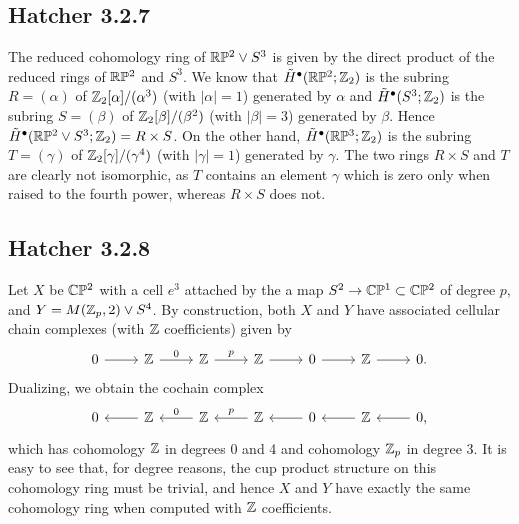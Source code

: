 \documentclass{../mathnotes}
\begin{document}
\subsection*{Hatcher 3.2.7}

The reduced cohomology ring of $\mathbb{R}\mathbb{P}^2\vee S^3$ is given by the direct product of the
reduced rings of $\mathbb{R}\mathbb{P}^2$ and $S^3$. We know that $\tilde H^\bullet(\mathbb{R}\mathbb{P}^2;\mathbb{Z}_2)$ is 
the subring $R=(\alpha)$ of $\mathbb{Z}_2[\alpha]/(\alpha^3)$ (with $|\alpha|=1$) generated by $\alpha$
and $\tilde H^\bullet(S^3;\mathbb{Z}_2)$ is the subring $S=(\beta)$ of $\mathbb{Z}_2[\beta]/(\beta^2)$ (with
$|\beta|=3$) generated by $\beta$. Hence $\tilde H^\bullet(\mathbb{R}\mathbb{P}^2\vee S^3;\mathbb{Z}_2)=R\times S$.
On the other hand, $\tilde H^\bullet(\mathbb{R}\mathbb{P}^3;\mathbb{Z}_2)$ is the subring $T=(\gamma)$ of $\mathbb{Z}_2[\gamma]/(\gamma^4)$
(with $|\gamma|=1$) generated by $\gamma$. The two rings $R\times S$ and $T$ are
clearly not isomorphic, as $T$ contains an element $\gamma$ which is zero only when raised to
the fourth power, whereas $R\times S$ does not.

\subsection*{Hatcher 3.2.8}

Let $X$ be $\mathbb{C}\mathbb{P}^2$ with a cell $e^3$ attached by the a map $S^2\to\mathbb{C}\mathbb{P}^1\subset\mathbb{C}\mathbb{P}^2$ of
degree $p$, and $Y=M(\mathbb{Z}_p,2)\vee S^4$. By construction, both $X$ and $Y$ have associated
cellular chain complexes (with $\mathbb{Z}$ coefficients) given by
\begin{equation*}
    \begin{tikzcd}
        0\ar{r} & \Z\ar{r}{0} & \Z\ar{r}{p} & \Z\ar{r}& 0\ar{r}& \Z\ar{r} & 0.
    \end{tikzcd}
\end{equation*}
Dualizing, we obtain the cochain complex
\begin{equation*}
    \begin{tikzcd}
        0 & \Z\ar{l} & \Z\ar[swap]{l}{0} & \Z\ar[swap]{l}{p}& 0\ar{l}& \Z\ar{l} & 0\ar{l},
    \end{tikzcd}
\end{equation*}
which has cohomology $\mathbb{Z}$ in degrees 0 and 4 and cohomology $\mathbb{Z}_p$ in degree 3. It is easy
to see that, for degree reasons, the cup product structure on this cohomology ring must be
trivial, and hence $X$ and $Y$ have exactly the same cohomology ring when computed with $\mathbb{Z}$
coefficients.
\end{document}

